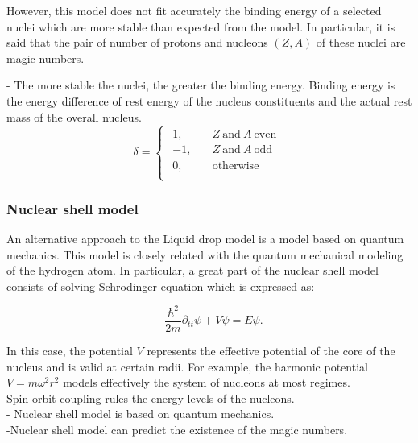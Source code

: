 \documentclass[openany]{book}
\begin{document}
However, this model does not fit accurately the binding energy of a selected nuclei which are more stable than expected from the model. In particular, it is said that the pair of number of protons and nucleons $(Z, A)$ of these nuclei are magic numbers. 


-	The more stable the nuclei, the greater the binding energy.
Binding energy is the energy difference of rest energy of the nucleus constituents and the actual  rest mass of the overall nucleus. \\


\begin{equation} \label{eq:liquidDrop_deltaFactor}
	\delta = 	\left\{\begin{array}{l}
		\begin{split}
			1, \quad & Z \ \mathrm{and} \ A \  \mathrm{even} \\ 
			-1, \quad &  Z \ \mathrm{and} \ A \  \mathrm{odd} 	\\
			0, \quad & \mathrm{otherwise}	\\
		\end{split}
	\end{array}\right.
\end{equation}
\subsubsection{Nuclear shell model}  \label{ssub:nuclearShellModel}

An alternative approach to the Liquid drop model is a model based on quantum mechanics. This model is closely related with the quantum mechanical modeling of the hydrogen atom. In particular, a great part of the nuclear shell model consists of solving Schrodinger equation which is expressed as:

\begin{equation} \label{eq:nuclearShell_schrodinger}
	- \frac{\hbar^2}{2m} \partial_{tt} \psi + V  \psi = E \psi.
\end{equation}

In this case, the potential $V$ represents the effective potential of the core of the nucleus and is valid at certain radii. For example, the harmonic potential $V = m\omega^2r^2$ models effectively the system of nucleons at most regimes. \\

Spin orbit coupling rules the energy levels of the nucleons.  \\

- Nuclear shell model is based on quantum mechanics. \\
-Nuclear shell model can predict the existence of the magic numbers.
\end{document}

